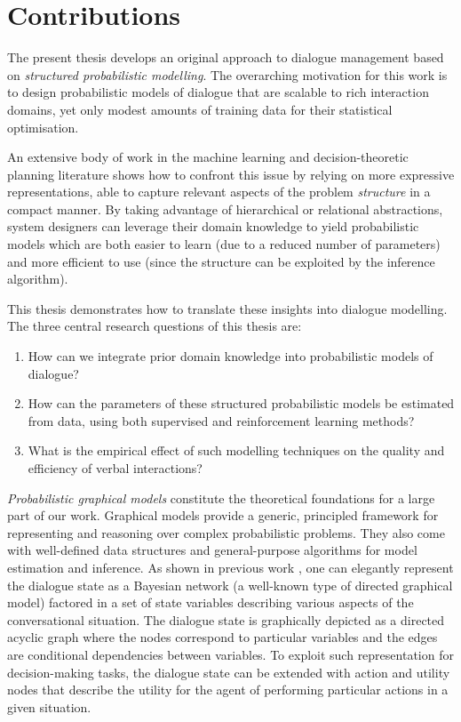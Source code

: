 \section{Contributions}

The present thesis develops an original approach to dialogue management based on \textit{structured probabilistic modelling}.  The overarching motivation for this work is to design probabilistic models of dialogue that are scalable to rich interaction domains, yet only modest amounts of training data for their statistical optimisation.

An extensive body of work in the machine learning and decision-theoretic planning literature shows how to confront this issue by relying on more expressive representations, able to capture relevant aspects of the problem \textit{structure} in a compact manner. By taking advantage of hierarchical or relational abstractions, system designers can leverage their domain knowledge to yield probabilistic models which are both easier to learn (due to a reduced number of parameters) and more efficient to use (since the structure can be exploited by the inference algorithm).  

This thesis demonstrates how to translate these insights into dialogue modelling.  The three central research questions of this thesis are:
\begin{enumerate}
\item How can we integrate prior domain knowledge into probabilistic models of dialogue?
\item How can the parameters of these structured probabilistic models be estimated from data, using both supervised and reinforcement learning methods?  
\item What is the empirical effect of such modelling techniques on the quality and efficiency of verbal interactions?
\end{enumerate}

\textit{Probabilistic graphical models} \citep{Koller+Friedman:09} constitute the theoretical foundations for a large part of our work.  Graphical models provide a generic, principled framework for representing and reasoning over complex probabilistic problems. They also come with well-defined data structures and general-purpose algorithms for model estimation and inference.  As shown in previous work \citep[see for instance][]{Thomson:2010:BUD:1772996.1773040}, one can elegantly represent the dialogue state as a Bayesian network (a well-known type of directed graphical model) factored in a set of state variables describing various aspects of the conversational situation.  The dialogue state is graphically depicted as a directed acyclic graph where the nodes correspond to particular variables and the edges are conditional dependencies between variables. To exploit such representation for decision-making tasks, the dialogue state can be extended with action and utility nodes that describe the utility for the agent of performing particular actions in a given situation. 


